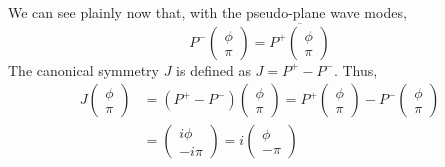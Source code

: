 \documentclass[12pt,oneside]{article}
\begin{document}
We can see plainly now that, with the pseudo-plane wave modes,
\begin{equation}
P^-\begin{pmatrix}\phi\\ \pi\end{pmatrix}=\overline{P^+\begin{pmatrix}\phi\\ \pi\end{pmatrix}}
\end{equation}
The canonical symmetry $J$ is defined as $J=P^{+}-P^{-}$. Thus,
\begin{align*}
J\begin{pmatrix}\phi \\ \pi\end{pmatrix}&=(P^{+}-P^{-})\begin{pmatrix}\phi \\ \pi\end{pmatrix}=P^+\begin{pmatrix}\phi \\ \pi\end{pmatrix}-P^-\begin{pmatrix}\phi \\ \pi\end{pmatrix}\\
&=\begin{pmatrix}i\phi \\ -i\pi\end{pmatrix}=i\begin{pmatrix}\phi \\ -\pi\end{pmatrix}
\end{align*}
\end{document}
